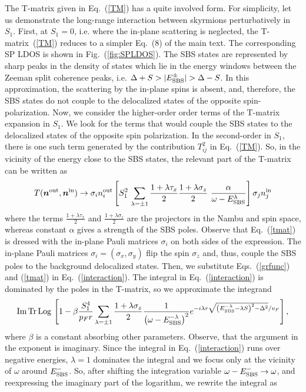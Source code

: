 \documentclass[twocolumn,showpacs,floatfix,longbibliography]{revtex4-1}
\begin{document}
\begin{widetext}
The T-matrix given in Eq.~(\ref{TM}) has a quite involved form. For simplicity, let us demonstrate the long-range interaction between skyrmions perturbatively in $S_1$. First, at $S_1 = 0$, i.e. where the in-plane scattering is neglected, the T-matrix~(\ref{TM}) reduces to a simpler Eq.~(8) of the main text. The corresponding SP LDOS is shown in Fig.~(\ref{fig:SPLDOS}). The SBS states are represented by sharp peaks in the density of states which lie in the energy windows between the Zeeman split coherence peaks, i.e. $\Delta+S>|E^\pm_{\rm SBS}|>\Delta-S$. In this approximation, the scattering by the in-plane spins is absent, and, therefore, the SBS states do not couple to the delocalized states of the opposite spin-polarization. Now, we consider the higher-order order terms of the T-matrix expansion in $S_1$. We look for the terms that would couple the SBS states to the delocalized states of the opposite spin polarization. In the second-order in $S_1$, there is one such term generated by the contribution $T^2_{ij}$ in Eq.~(\ref{TM}). So, in the vicinity of the energy close to the SBS states, the relevant part of the T-matrix can be written as 
\begin{equation}
	T(\bm n^{\rm out},\bm n^{\rm in}) \rightarrow \sigma_i n_i^{\rm out}\left[S_1^2\,\sum_{\lambda=\pm 1} \frac{1+\lambda\tau_x}{2}\frac{1+\lambda\sigma_z}{2} \,\,\frac{\alpha}{\omega-E^{\lambda}_{\rm SBS}}\right] \sigma_j n_j^{\rm in}
	\label{tmat}
\end{equation}
where the terms $\frac{1+\lambda\tau_x}{2}$ and $\frac{1+\lambda\sigma_z}{2}$ are the projectors in the Nambu and spin space, whereas constant $\alpha$ gives a strength of the SBS poles. Observe that Eq.~(\ref{tmat})  is dressed with the in-plane Pauli matrices $\sigma_i$ on both sides of the expression. The in-plane Pauli matrices $\sigma_i=(\sigma_x,\sigma_y)$ flip the spin $\sigma_z$ and, thus, couple the SBS poles to the background delocalized states. Then, we substitute Eqs.~(\ref{grfunc}) and (\ref{tmat}) in Eq.~(\ref{interaction}). The integral in Eq.~(\ref{interaction}) is dominated by the poles in the T-matrix, so we approximate the integrand
\begin{align}
	{\rm Im\,Tr\, Log\,} \left[ 1-   \beta\frac{S_1^4}{p_Fr} \sum_{\lambda = \pm 1} \frac{1+\lambda\sigma_z}{2} \frac{1}{\left(\omega-E^{-\lambda}_{\rm SBS}\right)^2} e^{-i\lambda r\sqrt{\left( E^{-\lambda}_{\rm SBS}-\lambda S \right)^2-\Delta^2}/v_F} \right],
	\label{tgtg}
\end{align}
where $\beta$ is a constant absorbing other parameters. Observe, that the argument in the exponent is imaginary. Since the integral in Eq.~(\ref{interaction}) runs over negative energies, $\lambda=1$ dominates the integral and we focus only at the vicinity of $\omega$ around $E^{-}_{\rm SBS}$. So, after shifting the integration variable $\omega-E^{-}_{\rm SBS}\rightarrow\omega$, and reexpressing the imaginary part of the logarithm, we rewrite the integral as  

\end{widetext}
\end{document}
